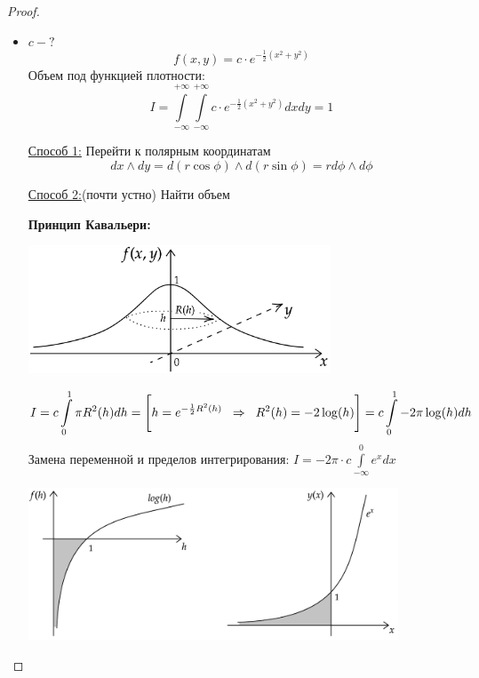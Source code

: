 \documentclass[12pt]{article} %
\theoremstyle{definition} %
\begin{document}
\begin{proof}
\begin{itemize}[label={$\bullet$}]
        \item $c - ?$
            \[
                f(x,y) = c \cdot e^{-\frac{1}{2}(x^2+y^2)}
            \]
            Объем под функцией плотности:
            \[
                I = \int\limits_{-\infty}^{+\infty}\int\limits_{-\infty}^{+\infty} c \cdot e^{-\frac{1}{2}(x^2+y^2)}dxdy = 1
            \]

            \underline{Способ 1:} Перейти к полярным координатам \\
            \[
            dx \wedge dy = d(r\cos{\phi}) \wedge d(r\sin{\phi}) = rd\phi \wedge d\phi
            \]
            \par \underline{Способ 2:}(почти устно) Найти объем \par
            \smallskip
            \textbf{Принцип Кавальери:}
            \begin{center}
               \includegraphics[width=9cm]{images/pic02_06.png}
            \end{center}
            \[
            I = c \int\limits_{0}^{1}\pi R^2(h) dh =
            \Bigg[h = e^{-\frac{1}{2}R^2(h)} \hspace{0.2cm} \Rightarrow \hspace{0.2cm} R^2(h) = -2\log(h)\Bigg] = c \int\limits_{0}^{1} -2\pi \log(h) dh
            \]
            \newpage
            Замена переменной и пределов интегрирования: $I = -2\pi \cdot c \int\limits_{-\infty}^{0}e^{x}dx$
            \begin{center}
               \includegraphics[width=11cm]{images/pic03_06.png}
            \end{center}


\end{itemize}
\end{proof}
\end{document}

